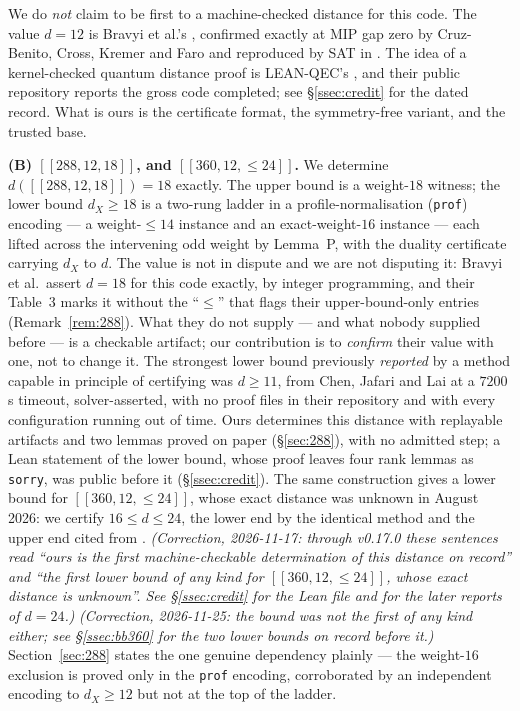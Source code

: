 \documentclass[11pt]{amsart}
\newcommand{\dX}{d_{X}}
\theoremstyle{plain}
\theoremstyle{definition}
\theoremstyle{remark}
\begin{document}
We do \emph{not} claim to be first to a machine-checked distance for this
code. The value $d=12$ is Bravyi et al.'s \cite[Table 3]{BCGMRY}, confirmed
exactly at MIP gap zero by Cruz-Benito, Cross, Kremer and Faro
\cite{CruzBenito} and reproduced by SAT in \cite{ChenJafariLai}. The idea of
a kernel-checked quantum distance proof is LEAN-QEC's \cite{LeanQEC}, and
their public repository reports the gross code completed; see
\S\ref{ssec:credit} for the dated record. What is ours is the certificate
format, the symmetry-free variant, and the trusted base.

\smallskip
\noindent\textbf{(B) $[[288,12,18]]$, and $[[360,12,\le24]]$.} We determine
$d([[288,12,18]])=18$ exactly. The upper bound is a weight-$18$ witness; the
lower bound $\dX\ge18$ is a two-rung ladder in a profile-normalisation
(\texttt{prof}) encoding --- a weight-$\le14$ instance and an exact-weight-$16$
instance --- each lifted across the intervening odd weight by Lemma~P, with the
duality certificate carrying $\dX$ to $d$. The value is not in dispute and we
are not disputing it: Bravyi et al.\ assert $d=18$ for this code exactly, by
integer programming, and their Table~3 marks it without the ``$\le$'' that
flags their upper-bound-only entries (Remark~\ref{rem:288}). What they do not
supply --- and what nobody supplied before --- is a checkable artifact; our
contribution is to \emph{confirm} their value with one, not to change it. The
strongest lower bound previously \emph{reported} by a method capable in
principle of certifying was $d\ge11$, from Chen, Jafari and Lai
\cite{ChenJafariLai} at a $7200$\,s timeout, solver-asserted, with no proof
files in their repository and with every configuration running out of time.
Ours determines this distance with replayable artifacts and two lemmas proved
on paper (\S\ref{sec:288}), with no admitted step; a Lean statement of the
lower bound, whose proof leaves four rank lemmas as \texttt{sorry}, was public
before it (\S\ref{ssec:credit}). The same construction gives a lower
bound for $[[360,12,\le24]]$, whose exact distance was unknown in August 2026:
we certify $16\le d\le24$, the lower end
by the identical method and the upper end cited from \cite{BCGMRY}.
\emph{(Correction, 2026-11-17: through v0.17.0 these sentences read ``ours is
the first machine-checkable determination of this distance on record'' and
``the first lower bound of any kind for $[[360,12,\le24]]$, whose exact
distance is unknown''. See \S\ref{ssec:credit} for the Lean file and for the
later reports of $d=24$.)} \emph{(Correction, 2026-11-25: the bound was not
the first of any kind either; see \S\ref{ssec:bb360} for the two lower bounds
on record before it.)} Section~\ref{sec:288}
states the one genuine dependency plainly --- the weight-$16$ exclusion is
proved only in the \texttt{prof} encoding, corroborated by an independent
encoding to $\dX\ge12$ but not at the top of the ladder.
\end{document}
